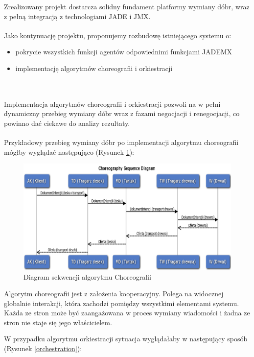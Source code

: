 \documentclass[a4paper,12pt]{article}
\begin{document}
Zrealizowany projekt dostarcza solidny fundament platformy wymiany dóbr, wraz z pełną integracją z technologiami JADE i JMX.
\\ \\
Jako kontynuację projektu, proponujemy rozbudowę istniejącego systemu o:
\begin{itemize}
\item pokrycie wszystkich funkcji agentów odpowiednimi funkcjami JADEMX
\item implementację algorytmów choreografii i orkiestracji
\end{itemize}
\\ \\
Implementacja algorytmów choreografii i orkiestracji pozwoli na w pełni dynamiczny przebieg wymiany dóbr wraz z fazami negocjacji i renegocjacji, co powinno dać ciekawe do analizy rezultaty.
\\ \\
Przykładowy przebieg wymiany dóbr po implementacji algorytmu choreografii mógłby wyglądać następująco (Rysunek \ref{choreography}):

\begin{figure}[!h]
\begin{center}
\includegraphics[scale=0.6]{gfx/PlatformaWymianyDobr-img11.png}
\caption{Diagram sekwencji algorytmu Choreografii}
\label{choreography}
\end{center}
\end{figure}

Algorytm choreografii jest z założenia kooperacyjny. Polega na widocznej globalnie interakcji, która zachodzi pomiędzy wszystkimi elementami systemu. Każda ze stron może być zaangażowana w proces wymiany wiadomości i żadna ze stron nie staje się jego właścicielem.

W przypadku algorytmu orkiestracji sytuacja wyglądałaby w następujący sposób (Rysunek \ref{orchestration}):
\end{document}
